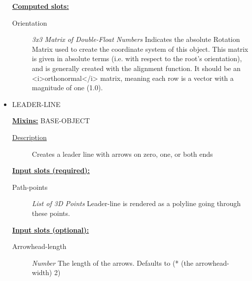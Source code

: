 \documentclass [11pt]{book}
\begin{document}
\begin{itemize}
\textbf{
\underline{Computed slots:}}

\begin{description}

\item [Orientation]
\emph{3x3 Matrix of Double-Float Numbers} Indicates the absolute Rotation Matrix used to create
the coordinate system of this object. This matrix is given in absolute terms (i.e. with
respect to the root's orientation), and is generally created with the alignment function.
It should be an <i>orthonormal</i> matrix, meaning each row is a vector with a magnitude
of one (1.0).


\end{description}







\item {}LEADER-LINE


\textbf{
\underline{Mixins:}} BASE-OBJECT





\begin{description}

\item [
\underline{Description}]


Creates a leader line with arrows on zero, one, or both ends



\end{description}








\textbf{
\underline{Input slots (required):}}

\begin{description}

\item [Path-points]
\emph{List of 3D Points} Leader-line is rendered as a polyline going through these points.


\end{description}






\textbf{
\underline{Input slots (optional):}}

\begin{description}

\item [Arrowhead-length]
\emph{Number} The length of the arrows. Defaults to (* (the arrowhead-width) 2)



\end{description}
\end{itemize}
\end{document}
